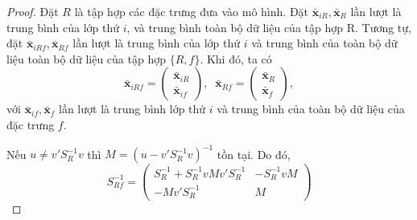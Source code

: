 \begin{proof}
	Đặt $R$ là tập hợp các đặc trưng đưa vào mô hình. Đặt $\bar{\boldsymbol{x}}_{iR}, \bar{\boldsymbol{x}}_R$ lần lượt là trung bình của lớp thứ $i$, và trung bình toàn bộ dữ liệu của tập hợp R. Tương tự, đặt $\bar{\boldsymbol{x}}_{iRf}, \bar{\boldsymbol{x}}_{Rf}$ lần lượt là trung bình của lớp thứ $i$ và trung bình của toàn bộ dữ liệu toàn bộ dữ liệu của tập hợp $\{R, f\}$. Khi đó, ta có
	\begin{equation}
		\bar{\boldsymbol{x}}_{iRf} = \begin{pmatrix}
			\bar{\boldsymbol{x}}_{iR}\\\bar{\boldsymbol{x}}_{if}
		\end{pmatrix}, \;\;
		\bar{\boldsymbol{x}}_{Rf} = \begin{pmatrix}
			\bar{\boldsymbol{x}}_{R}\\\bar{\boldsymbol{x}}_{f}
		\end{pmatrix},
	\end{equation}
	với  $\bar{\boldsymbol{x}}_{if}, \bar{\boldsymbol{x}}_f$ lần lượt là trung bình lớp thứ $i$ và trung bình của toàn bộ dữ liệu của đặc trưng $f$.
	
	Nếu $u\neq v'S_R^{-1}v$ thì $M = (u-v'S_R^{-1}v)^{-1}$ tồn tại. Do đó,
	\begin{equation}
		S_{Rf}^{-1} = \begin{pmatrix}
			S_R^{-1}+S_R^{-1}vMv'S_R^{-1} & -S_R^{-1}vM\\
			-Mv'S_R^{-1}&M
		\end{pmatrix}
	\end{equation}
	

\end{proof}
